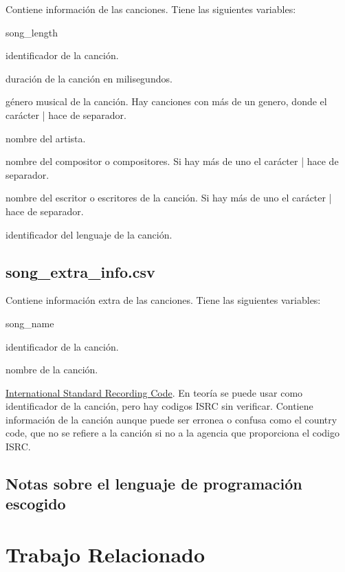 \documentclass[a4paper]{article}
\begin{document}
Contiene información de las canciones. Tiene las siguientes variables:
\begin{labeling}{song\_length}
\item [song\_id] identificador de la canción.
\item [song\_length] duración de la canción en milisegundos.
\item [genre\_ids] género musical de la canción. Hay canciones con más de un genero, donde el carácter | hace de separador.
\item [artist\_name] nombre del artista.
\item [composer] nombre del compositor o compositores. Si hay más de uno el carácter | hace de separador.
\item [lyricist] nombre del escritor o escritores de la canción. Si hay más de uno el carácter | hace de separador.
\item [language] identificador del lenguaje de la canción.
\end{labeling}

\subsection*{song\_extra\_info.csv}
Contiene información extra de las canciones. Tiene las siguientes variables:
\begin{labeling}{song\_name}
\item [song\_id] identificador de la canción.
\item [song\_name] nombre de la canción.
\item [isrc] \href{https://en.wikipedia.org/wiki/International_Standard_Recording_Code}{International Standard Recording Code}. En teoría se puede usar como identificador de la canción, pero hay codigos ISRC sin verificar. Contiene información de la canción aunque puede ser erronea o confusa como el country code, que no se refiere a la canción si no a la agencia que proporciona el codigo ISRC.
\end{labeling}


\subsection{Notas sobre el lenguaje de programación escogido}


\section{Trabajo Relacionado}
\end{document}
